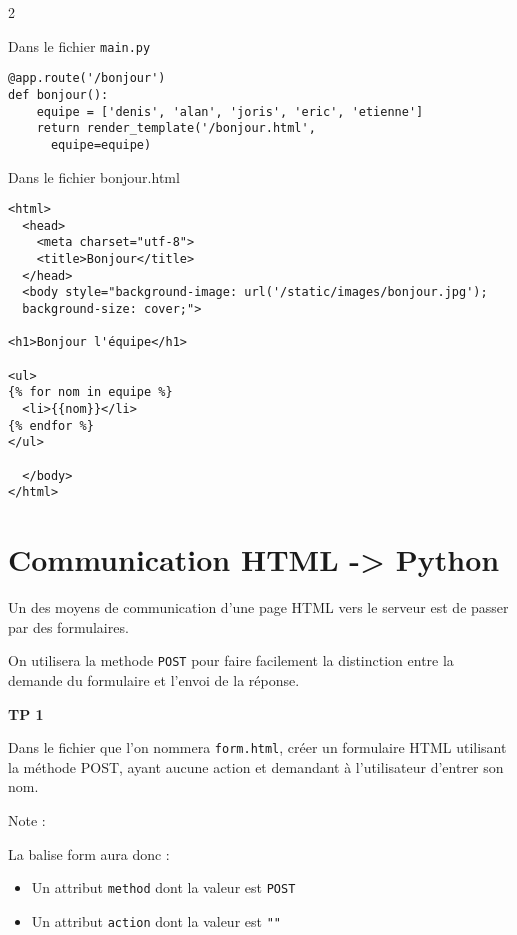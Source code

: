 \documentclass[12pt,a4paper]{article}
\begin{document}
\begin{multicols}2

Dans le fichier \texttt{main.py}

\begin{verbatim}
@app.route('/bonjour')
def bonjour():
    equipe = ['denis', 'alan', 'joris', 'eric', 'etienne']
    return render_template('/bonjour.html',
      equipe=equipe)
\end{verbatim}

\columnbreak


Dans le fichier bonjour.html

\begin{verbatim}
<html>
  <head>
    <meta charset="utf-8">
    <title>Bonjour</title> 
  </head>
  <body style="background-image: url('/static/images/bonjour.jpg');
  background-size: cover;">
    
<h1>Bonjour l'équipe</h1>

<ul>
{% for nom in equipe %}
  <li>{{nom}}</li>
{% endfor %}
</ul>

  </body>
</html>
\end{verbatim}

\end{multicols}


 \section{Communication HTML -> Python}
 

Un des moyens de communication d'une page HTML vers  le serveur est de passer par des formulaires.

On utilisera la methode \texttt{POST} pour faire facilement la distinction entre la demande du formulaire et l'envoi de la réponse. 

\textbf{TP 1}

Dans le fichier que l'on nommera \texttt{form.html}, créer un formulaire HTML utilisant la méthode POST, ayant aucune action et  demandant à l'utilisateur d'entrer son nom.

\par 

Note : \par 
La balise form aura donc : 
\begin{itemize}
  \item Un attribut \texttt{method} dont la valeur est \texttt{POST}
  \item Un attribut \texttt{action} dont la valeur est \texttt{""}
\end{itemize}
\end{document}
